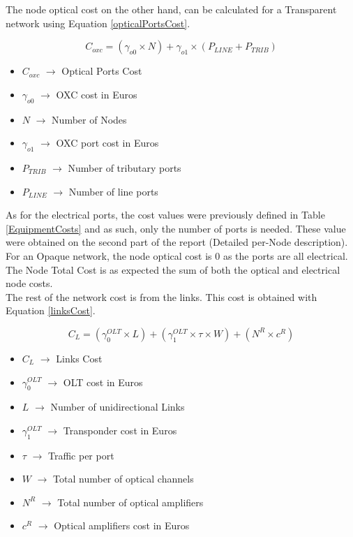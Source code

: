 	The node optical cost on the other hand, can be calculated for a Transparent network using Equation \ref{opticalPortsCost}.
	
	\begin{equation}
		C_{oxc} = \left(\gamma_{o0} \times N \right) + \gamma_{o1} \times  \left(P_{LINE} + P_{TRIB}\right)
		\label{opticalPortsCost}
	\end{equation}	
	
	\begin{itemize}
		\item{$C_{oxc}$		$\rightarrow$	Optical Ports Cost}
		\item{$\gamma_{o0}$	$\rightarrow$	OXC cost in Euros}
		\item{$N$			$\rightarrow$	Number of Nodes}
		\item{$\gamma_{o1}$	$\rightarrow$	OXC port cost in Euros}
		\item{$P_{TRIB}	$	$\rightarrow$	Number of tributary ports}
		\item{$P_{LINE} $	$\rightarrow$	Number of line ports}
	\end{itemize}
		
	As for the electrical ports, the cost values were previously defined in Table \ref{EquipmentCosts} and as such, only the number of ports is needed. These value were obtained on the second part of the report (Detailed per-Node description). \\
	
	For an Opaque network, the node optical cost is 0 as the ports are all electrical. \\
	
	The Node Total Cost is as expected the sum of both the optical and electrical node costs. \\
	
	The rest of the network cost is from the links. This cost is obtained with Equation \ref{linksCost}.
	
	\begin{equation}
		C_L = \left(\gamma_0^{OLT} \times L\right) + \left(\gamma_1^{OLT} \times \tau \times W\right) + \left(N^R \times c^R\right)
		\label{linksCost}
	\end{equation}	
	
	\begin{itemize}
		\item{$C_L$				$\rightarrow$	Links Cost}
		\item{$\gamma_0^{OLT}$	$\rightarrow$	OLT cost in Euros}
		\item{$L$				$\rightarrow$	Number of unidirectional Links}
		\item{$\gamma_1^{OLT}$	$\rightarrow$	Transponder cost in Euros}
		\item{$\tau$			$\rightarrow$	Traffic per port}
		\item{$W$				$\rightarrow$	Total number of optical channels}
		\item{$N^R$				$\rightarrow$	Total number of optical amplifiers}
		\item{$c^R$				$\rightarrow$	Optical amplifiers cost in Euros}
	\end{itemize}
	
